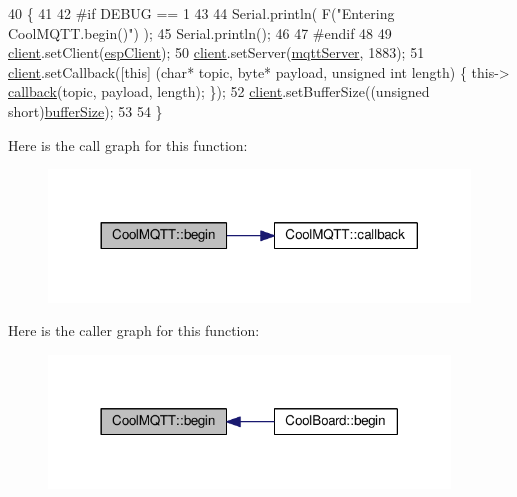 \begin{DoxyCode}
40 \{ 
41 
42 \textcolor{preprocessor}{#if DEBUG == 1 }
43 
44     Serial.println( F(\textcolor{stringliteral}{"Entering CoolMQTT.begin()"}) );
45     Serial.println();
46 
47 \textcolor{preprocessor}{#endif}
48 
49     \hyperlink{classCoolMQTT_a4ca71e4f76ef868692a297efd45b1415}{client}.setClient(\hyperlink{classCoolMQTT_acc30a0200967374a524092a8a806502a}{espClient});
50     \hyperlink{classCoolMQTT_a4ca71e4f76ef868692a297efd45b1415}{client}.setServer(\hyperlink{classCoolMQTT_ab8bb951f87ddbf92db74c2ad16a3e53e}{mqttServer}, 1883); 
51     \hyperlink{classCoolMQTT_a4ca71e4f76ef868692a297efd45b1415}{client}.setCallback([\textcolor{keyword}{this}] (\textcolor{keywordtype}{char}* topic, byte* payload, \textcolor{keywordtype}{unsigned} \textcolor{keywordtype}{int} length) \{ this->
      \hyperlink{classCoolMQTT_a30d82ad665bfb603f46ecdbc290775df}{callback}(topic, payload, length); \});
52     \hyperlink{classCoolMQTT_a4ca71e4f76ef868692a297efd45b1415}{client}.setBufferSize((\textcolor{keywordtype}{unsigned} \textcolor{keywordtype}{short})\hyperlink{classCoolMQTT_a7f3cf26b51d6770f216e42c5ef13ca9f}{bufferSize});
53 
54 \}
\end{DoxyCode}
Here is the call graph for this function\+:\nopagebreak
\begin{figure}[H]
\begin{center}
\leavevmode
\includegraphics[width=317pt]{classCoolMQTT_ac9248808641ebf3054ed0620ea9d0100_cgraph}
\end{center}
\end{figure}
Here is the caller graph for this function\+:\nopagebreak
\begin{figure}[H]
\begin{center}
\leavevmode
\includegraphics[width=302pt]{classCoolMQTT_ac9248808641ebf3054ed0620ea9d0100_icgraph}
\end{center}
\end{figure}
\mbox{\label{classCoolMQTT_a30d82ad665bfb603f46ecdbc290775df}} 
